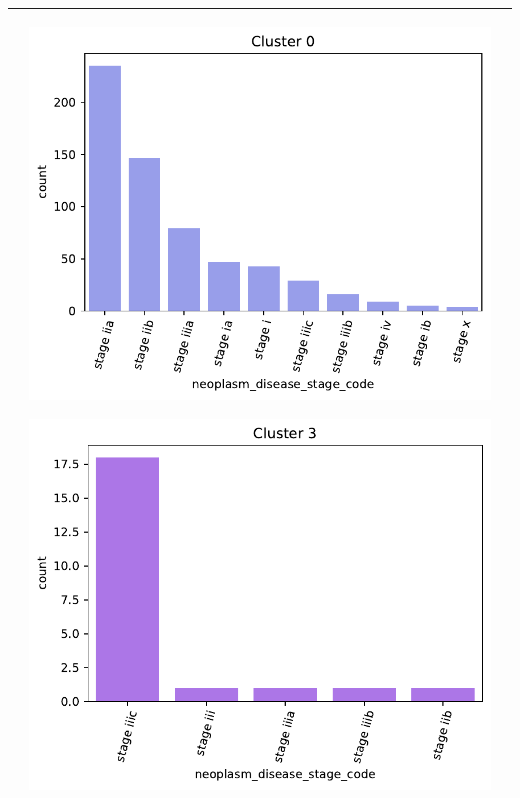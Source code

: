 \begin{table}[htb!]
\begin{threeparttable}
\begin{tabular}{p{2.5cm} p{7cm} p{6.5cm}}
			& 
			\begin{center}\includegraphics[width=1\linewidth]{NOTEBOOK/IMAGENES_BIRCH_CLUSTERING/3_Cluster_0_neoplasm_disease_stage_code}\end{center}
			\begin{center}\includegraphics[width=1\linewidth]{NOTEBOOK/IMAGENES_BIRCH_CLUSTERING/3_Cluster_3_neoplasm_disease_stage_code}\end{center}
			
			\\ \hline
		\end{tabular}
	\end{threeparttable}
\end{table}

